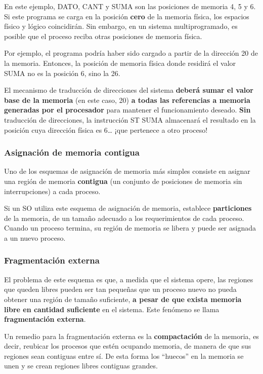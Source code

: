 \documentclass[spanish,a4paper,]{article}
\begin{document}
En este ejemplo, DATO, CANT y SUMA son las posiciones de memoria 4, 5 y
6. Si este programa se carga en la posición \textbf{cero} de la memoria
física, los espacios físico y lógico coincidirán. Sin embargo, en un
sistema multiprogramado, es posible que el proceso reciba otras
posiciones de memoria física.

Por ejemplo, el programa podría haber sido cargado a partir de la
dirección 20 de la memoria. Entonces, la posición de memoria física
donde residirá el valor SUMA no es la posición 6, sino la 26.

El mecanismo de traducción de direcciones del sistema \textbf{deberá
sumar el valor base de la memoria} (en este caso, 20) \textbf{a todas
las referencias a memoria generadas por el procesador} para mantener el
funcionamiento deseado. \textbf{Sin} traducción de direcciones, la
instrucción ST SUMA almacenará el resultado en la posición cuya
dirección física es 6\ldots{} ¡que pertenece a otro proceso!

\hypertarget{asignaciuxf3n-de-memoria-contigua}{%
\subsubsection{Asignación de memoria
contigua}\label{asignaciuxf3n-de-memoria-contigua}}

Uno de los esquemas de asignación de memoria más simples consiste en
asignar una región de memoria \textbf{contigua} (un conjunto de
posiciones de memoria sin interrupciones) a cada proceso.

Si un SO utiliza este esquema de asignación de memoria, establece
\textbf{particiones} de la memoria, de un tamaño adecuado a los
requerimientos de cada proceso. Cuando un proceso termina, su región de
memoria se libera y puede ser asignada a un nuevo proceso.

\hypertarget{fragmentaciuxf3n-externa}{%
\subsubsection{Fragmentación externa}\label{fragmentaciuxf3n-externa}}

El problema de este esquema es que, a medida que el sistema opere, las
regiones que queden libres pueden ser tan pequeñas que un proceso nuevo
no pueda obtener una región de tamaño suficiente, \textbf{a pesar de que
exista memoria libre en cantidad suficiente} en el sistema. Este
fenómeno se llama \textbf{fragmentación externa}.

Un remedio para la fragmentación externa es la \textbf{compactación} de
la memoria, es decir, reubicar los procesos que estén ocupando memoria,
de manera de que sus regiones sean contiguas entre sí. De esta forma los
``huecos'' en la memoria se unen y se crean regiones libres contiguas
grandes.
\end{document}
